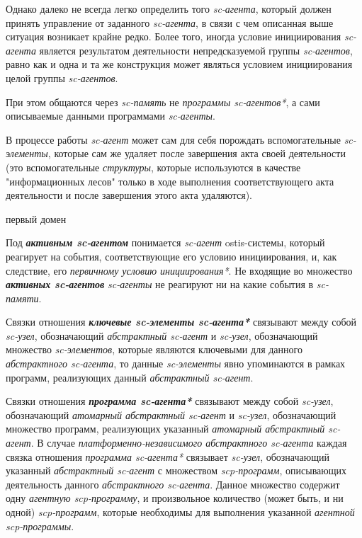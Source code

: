 Однако далеко не всегда легко определить того \textit{sc-агента}, который должен принять управление от заданного \textit{sc-агента}, в связи с чем описанная выше ситуация возникает крайне редко. Более того, иногда условие инициирования \textit{sc-агента} является результатом деятельности непредсказуемой группы \textit{sc-агентов}, равно как и одна и та же конструкция может являться условием инициирования целой группы \textit{sc-агентов}.

При этом общаются через \textit{sc-память} не \textit{программы sc-агентов*}, а сами описываемые данными программами \textit{sc-агенты}.

В процессе работы \textit{sc-агент} может сам для себя порождать вспомогательные \textit{sc-элементы}, которые сам же удаляет после завершения акта своей деятельности (это вспомогательные \textit{структуры}, которые используются в качестве "информационных лесов"{} только в ходе выполнения соответствующего акта деятельности и после завершения этого акта удаляются).

\begin{SCn}
\begin{scnrelfromlist}{первый домен}
\end{scnrelfromlist}
\end{SCn}

Под \textbf{\textit{активным sc-агентом}} понимается \textit{sc-агент} ostis-системы, который реагирует на события, соответствующие его условию инициирования, и, как следствие, его \textit{первичному условию инициирования*}. Не входящие во множество \textbf{\textit{активных sc-агентов}} \textit{sc-агенты} не реагируют ни на какие события в \textit{sc-памяти}.

Связки отношения \textbf{\textit{ключевые sc-элементы sc-агента*}} связывают между собой \textit{sc-узел}, обозначающий \textit{абстрактный sc-агент} и \textit{sc-узел}, обозначающий множество \textit{sc-элементов}, которые являются ключевыми для данного \textit{абстрактного sc-агента}, то данные \textit{sc-элементы} явно упоминаются в рамках программ, реализующих данный \textit{абстрактный sc-агент}.

Связки отношения \textbf{\textit{программа sc-агента*}} связывают между собой \textit{sc-узел}, обозначающий \textit{атомарный абстрактный sc-агент} и \textit{sc-узел}, обозначающий множество программ, реализующих указанный \textit{атомарный абстрактный sc-агент}. В случае \textit{платформенно-независимого абстрактного sc-агента} каждая связка отношения \textit{программа sc-агента*} связывает \textit{sc-узел}, обозначающий указанный \textit{абстрактный sc-агент} с множеством \textit{scp-программ}, описывающих деятельность данного \textit{абстрактного sc-агента}. Данное множество содержит одну \textit{агентную scp-программу}, и произвольное количество (может быть, и ни одной) \textit{scp-программ}, которые необходимы для выполнения указанной \textit{агентной scp-программы}.
	
